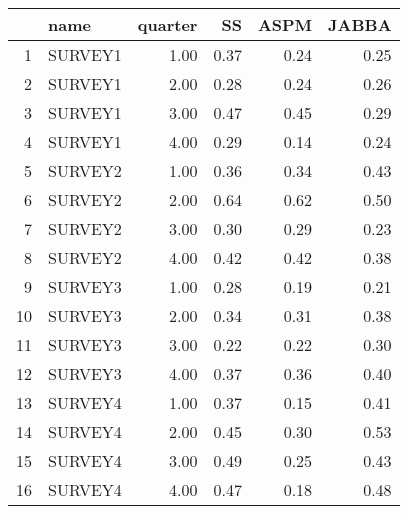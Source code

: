 \begin{table}[ht]
\centering
\begin{tabular}{rlrrrr}
  \hline
 & name & quarter & SS & ASPM & JABBA \\ 
  \hline
1 & SURVEY1 & 1.00 & 0.37 & 0.24 & 0.25 \\ 
  2 & SURVEY1 & 2.00 & 0.28 & 0.24 & 0.26 \\ 
  3 & SURVEY1 & 3.00 & 0.47 & 0.45 & 0.29 \\ 
  4 & SURVEY1 & 4.00 & 0.29 & 0.14 & 0.24 \\ 
  5 & SURVEY2 & 1.00 & 0.36 & 0.34 & 0.43 \\ 
  6 & SURVEY2 & 2.00 & 0.64 & 0.62 & 0.50 \\ 
  7 & SURVEY2 & 3.00 & 0.30 & 0.29 & 0.23 \\ 
  8 & SURVEY2 & 4.00 & 0.42 & 0.42 & 0.38 \\ 
  9 & SURVEY3 & 1.00 & 0.28 & 0.19 & 0.21 \\ 
  10 & SURVEY3 & 2.00 & 0.34 & 0.31 & 0.38 \\ 
  11 & SURVEY3 & 3.00 & 0.22 & 0.22 & 0.30 \\ 
  12 & SURVEY3 & 4.00 & 0.37 & 0.36 & 0.40 \\ 
  13 & SURVEY4 & 1.00 & 0.37 & 0.15 & 0.41 \\ 
  14 & SURVEY4 & 2.00 & 0.45 & 0.30 & 0.53 \\ 
  15 & SURVEY4 & 3.00 & 0.49 & 0.25 & 0.43 \\ 
  16 & SURVEY4 & 4.00 & 0.47 & 0.18 & 0.48 \\ 
   \hline
\end{tabular}
\end{table}
